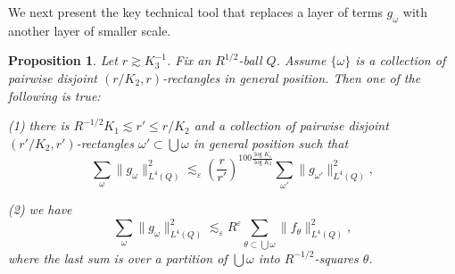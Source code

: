 \documentclass{amsart}%
\numberwithin{equation}{section}
\newtheorem{proposition}[theorem]{Proposition}
\newcommand{\e}{\varepsilon}
\newcommand{\1}{\mathbbm{1}}
\begin{document}
    
	We next present the key technical tool that replaces a layer of terms $g_\omega$ with another layer of smaller scale. 
	\begin{proposition}
	\label{pmainnnnnnnnnn}	
		Let $r\gtrsim K_3^{-1}$. Fix an $R^{1/2}$-ball $Q$.
		Assume $\{\omega\}$ is a collection of pairwise disjoint $(r/K_2,r)$-rectangles in general position. Then  one of the following is true:
		
		(1) there is  $R^{-1/2}K_1\lesssim r'\le r/K_2$
		and a collection of pairwise disjoint $(r'/K_2,r')$-rectangles  $\omega'\subset \bigcup\omega$ in general position such that 
		\begin{equation}
		\label{irojiojgiortjgiortjghio}
		\sum_{\omega}\|g_\omega\|_{L^4(Q)}^2\lesssim_\e (\frac{r}{r'})^{100\frac{\log{K_1}}{\log K_2}} \sum_{\omega'}\|g_{\omega'}\|_{L^4(Q)}^2,\end{equation}
		
		(2) we have
		\begin{equation}
			\label{dhdgfgjhuh3}\sum_{\omega}\|g_\omega\|_{L^4(Q)}^2\lesssim_\e R^\e \sum_{\theta\subset \bigcup\omega}\|f_{\theta}\|_{L^4(Q)}^2,
		\end{equation}
		where the last sum is over a partition of $\bigcup\omega$ into $R^{-1/2}$-squares $\theta$.
	\end{proposition}
\end{document}
